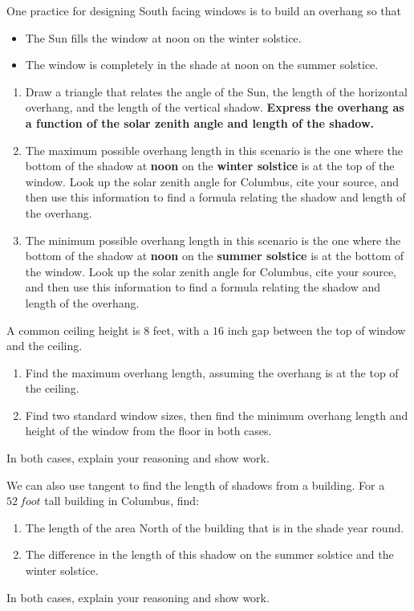 \documentclass[noauthor,nooutcomes,handout,hints,12pt]{ximera}
\begin{document}
\mynewpage


\begin{question}
 One practice for designing South facing windows is to build an
 overhang so that
 \begin{itemize}
 \item The Sun fills the window at noon on the winter solstice.
 \item The window is completely in the shade at noon on the summer
   solstice.
 \end{itemize}
\begin{enumerate}
\item Draw a triangle that relates the angle of the Sun, the length of
  the horizontal overhang, and the length of the vertical shadow.
  \textbf{Express the overhang as a function of the solar zenith angle and length of the shadow.}
\item The maximum possible overhang length in this scenario is the one
  where the bottom of the shadow at \textbf{noon} on the \textbf{winter solstice} is at
  the top of the window. Look up the solar zenith angle for Columbus,
  cite your source, and then use this information to find a formula relating the shadow and
  length of the overhang. 
\item The minimum possible overhang length in this scenario is the one
  where the bottom of the shadow at \textbf{noon} on the \textbf{summer solstice} is at
  the bottom of the window. Look up the solar zenith angle for Columbus, cite
  your source, and then use this information to find a formula relating the shadow and length
  of the overhang. 
\end{enumerate}
\end{question}
\mynewpage


\begin{question}
 A common ceiling height is $8$ feet, with a $16$ inch gap between the
 top of window and the ceiling.
 
\begin{enumerate}
 \item Find the maximum overhang length, assuming the overhang is at
   the top of the ceiling.
 \item Find two standard window sizes, then find the minimum overhang
   length and height of the window from the floor in both cases.
\end{enumerate}
In both cases, explain your reasoning and show work.
\end{question}
\mynewpage

\begin{question}
 We can also use tangent to find the length of shadows from a
 building. For a $52\ foot$ tall building in Columbus, find:
 
\begin{enumerate}
 \item The length of the area North of the building that is in the
   shade year round.
 \item The difference in the length of this shadow on the summer
   solstice and the winter solstice.
\end{enumerate}
In both cases, explain your reasoning and show work.
\end{question}
\end{document}
